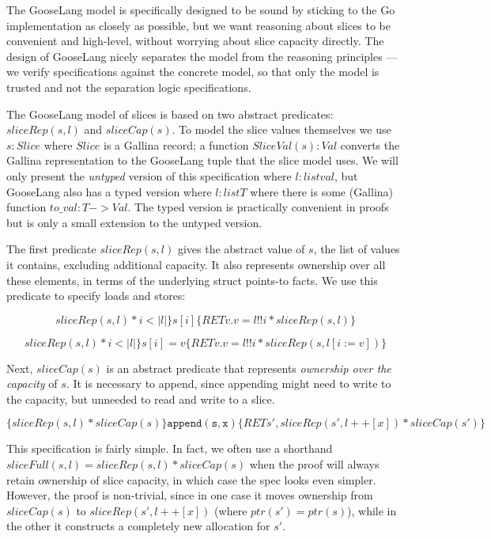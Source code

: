 The GooseLang model is specifically designed to be sound by sticking to
the Go implementation as closely as possible, but we want reasoning
about slices to be convenient and high-level, without worrying about
slice capacity directly. The design of GooseLang nicely separates the
model from the reasoning principles --- we verify specifications against
the concrete model, so that only the model is trusted and not the
separation logic specifications.

The GooseLang model of slices is based on two abstract predicates:
$sliceRep(s, l)$ and $sliceCap(s)$. To model the slice values
themselves we use $s : Slice$ where $Slice$ is a Gallina record; a
function $SliceVal(s) : Val$ converts the Gallina representation to
the GooseLang tuple that the slice model uses. We will only present the
\emph{untyped} version of this specification where $l : list val$, but
GooseLang also has a typed version where $l : list T$ where there is
some (Gallina) function $to\_val : T -> Val$. The typed version is
practically convenient in proofs but is only a small extension to the
untyped version.

The first predicate $sliceRep(s, l)$ gives the abstract value of
$s$, the list of values it contains, excluding additional capacity. It
also represents ownership over all these elements, in terms of the
underlying struct points-to facts. We use this predicate to specify
loads and stores:

\[
  sliceRep(s, l) * i < |l|\} s[i] \{RET v. v = l !! i * sliceRep(s, l)\}
\]

\[
  sliceRep(s, l) * i < |l|\} s[i] = v \{RET v. v = l !! i * sliceRep(s, l[i := v])\}
\]

Next, $sliceCap(s)$ is an abstract predicate that represents
\emph{ownership over the capacity} of $s$. It is necessary to append,
since appending might need to write to the capacity, but unneeded to
read and write to a slice.

$\{sliceRep(s, l) * sliceCap(s)\} \mathtt{append(s, x)} \{RET s', sliceRep(s', l ++ [x]) * sliceCap(s')\}$

This specification is fairly simple. In fact, we often use a shorthand
$sliceFull(s, l) = sliceRep(s, l) * sliceCap(s)$ when the proof will
always retain ownership of slice capacity, in which case the spec looks
even simpler. However, the proof is non-trivial, since in one case it
moves ownership from $sliceCap(s)$ to $sliceRep(s', l ++ [x])$
(where $ptr(s') = ptr(s)$), while in the other it constructs a
completely new allocation for $s'$.

